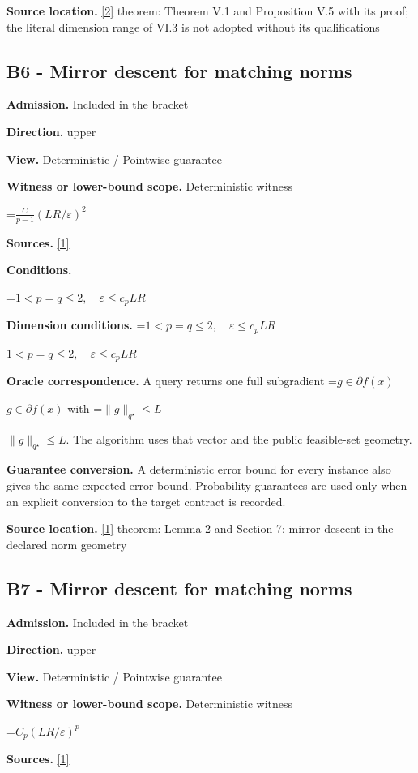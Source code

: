 \documentclass[10pt,a4paper]{article}
\newcommand{\AtlasMath}[1]{\par\begingroup\centering\setbox0=\hbox{$\displaystyle #1$}\ifdim\wd0>1.4\linewidth\typeout{ATLAS WIDE FORMULA: \the\wd0}\fi\ifdim\wd0>\linewidth\resizebox{\linewidth}{!}{\box0}\else\box0\fi\par\endgroup}
\newcommand{\AtlasInlineMath}[1]{\begingroup\setbox0=\hbox{$#1$}\ifdim\wd0>.4\linewidth\endgroup\AtlasMath{#1}\else\endgroup$#1$\fi}
\begin{document}
\textbf{Source location.} \href{https://arxiv.org/pdf/1407.5144}{[2]} theorem: Theorem V.1 and Proposition V.5 with its proof; the literal dimension range of VI.3 is not adopted without its qualifications

\subsection{B6 - Mirror descent for matching norms}
\textbf{Admission.} Included in the bracket

\textbf{Direction.} upper

\textbf{View.} Deterministic / Pointwise guarantee

\textbf{Witness or lower-bound scope.} Deterministic witness

\AtlasMath{\frac C{p-1}(LR/\varepsilon)^2}
\textbf{Sources.} \href{https://arxiv.org/pdf/1107.4080}{[1]}

\textbf{Conditions.} 
\AtlasMath{1<p=q\le2,\quad\varepsilon\le c_pLR}


\textbf{Dimension conditions.} \AtlasInlineMath{1<p=q\le2,\quad\varepsilon\le c_pLR}

\textbf{Oracle correspondence.} A query returns one full subgradient \AtlasInlineMath{g\in\partial f(x)} with \AtlasInlineMath{\|g\|_{q^\star}\le L}. The algorithm uses that vector and the public feasible-set geometry.

\textbf{Guarantee conversion.} A deterministic error bound for every instance also gives the same expected-error bound. Probability guarantees are used only when an explicit conversion to the target contract is recorded.

\textbf{Source location.} \href{https://arxiv.org/pdf/1107.4080}{[1]} theorem: Lemma 2 and Section 7: mirror descent in the declared norm geometry

\subsection{B7 - Mirror descent for matching norms}
\textbf{Admission.} Included in the bracket

\textbf{Direction.} upper

\textbf{View.} Deterministic / Pointwise guarantee

\textbf{Witness or lower-bound scope.} Deterministic witness

\AtlasMath{C_p(LR/\varepsilon)^p}
\textbf{Sources.} \href{https://arxiv.org/pdf/1107.4080}{[1]}
\end{document}
